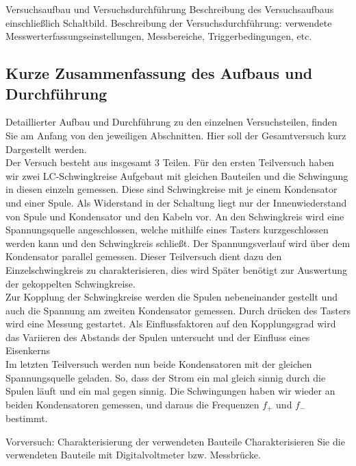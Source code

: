 \documentclass[twoside]{protokoll}
\begin{document}
 
\begin{aufgabe}{Versuchsaufbau und Versuchsdurchführung}
  Beschreibung des Versuchsaufbaus einschließlich
  Schaltbild. Beschreibung der Versuchsdurchführung: verwendete
  Messwerterfassungseinstellungen, Messbereiche, Triggerbedingungen,
  etc.
\end{aufgabe}

\subsection{Kurze Zusammenfassung des Aufbaus und Durchführung}

Detaillierter Aufbau und Durchführung zu den einzelnen Versuchsteilen, finden Sie am Anfang von den jeweiligen Abschnitten. 
Hier soll der Gesamtversuch kurz Dargestellt werden.\\

Der Versuch besteht aus insgesamt 3 Teilen. Für den ersten Teilversuch haben wir zwei LC-Schwingkreise Aufgebaut mit gleichen Bauteilen und die Schwingung in diesen einzeln gemessen. 
Diese sind Schwingkreise mit je einem Kondensator und einer Spule.
Als Widerstand in der Schaltung liegt nur der Innenwiederstand von Spule und Kondensator und den Kabeln vor. 
An den Schwingkreis wird eine Spannungsquelle angeschlossen, welche mithilfe eines Tasters kurzgeschlossen werden kann und den Schwingkreis schließt. 
Der Spannungsverlauf wird über dem Kondensator parallel gemessen. 
Dieser Teilversuch dient dazu den Einzelschwingkreis zu charakterisieren, dies wird Später benötigt zur Auswertung der gekoppelten Schwingkreise.\\

Zur Kopplung der Schwingkreise werden die Spulen nebeneinander gestellt und auch die Spannung am zweiten Kondensator gemessen. Durch drücken des Tasters wird eine Messung gestartet.
Als Einflussfaktoren auf den Kopplungsgrad wird das Variieren des Abstands der Spulen untersucht und der Einfluss eines Eisenkerns\\

Im letzten Teilversuch werden nun beide Kondensatoren mit der gleichen Spannungsquelle geladen. 
So, dass der Strom ein mal gleich sinnig durch die Spulen läuft und ein mal gegen sinnig. Die Schwingungen haben wir wieder an beiden Kondensatoren gemessen, und daraus die Frequenzen $f_+$ und $f_-$ bestimmt. 
 

\begin{aufgabe}{Vorversuch: Charakterisierung der verwendeten Bauteile}
  Charakterisieren Sie die verwendeten Bauteile mit Digitalvoltmeter
  bzw. Messbrücke.
\end{aufgabe}
\end{document}
